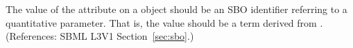 The value of the attribute  on a \Parameter object should be
an SBO identifier referring to a quantitative parameter.  That is, the
value should be a term derived from \sboparameter.  (References: SBML
 L3V1 Section~\ref{sec:sbo}.)
